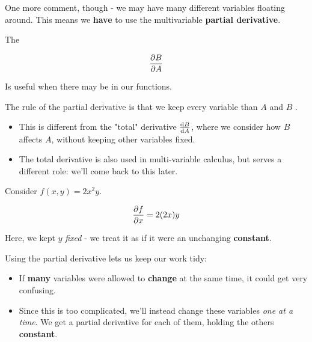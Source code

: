         One more comment, though - we may have many different variables floating around. This means we \textbf{have} to use the multivariable \textbf{partial derivative}.\\
        
        \begin{definition}
            The  
            
            \begin{equation*}
                \frac{\partial B}{\partial A}
            \end{equation*}
            
            Is useful when there may be  in our functions.
            
            The rule of the partial derivative is that we keep every variable  than $A$ and $B$ .

            \subsecdiv

            \begin{itemize}
                \item This is different from the "total" derivative $\frac{\dd B}{\dd A}$, where we consider how $B$ affects $A$, without keeping other variables fixed.

                \item The total derivative is also used in multi-variable calculus, but serves a different role: we'll come back to this later.
            \end{itemize}
        \end{definition}
        
        \miniex Consider $f(x,y) = 2x^2y$.
        
        \begin{equation}
            \frac{\partial f}{\partial x} = 2(2x)y
        \end{equation}
        
        Here, we kept $y$ \textit{fixed} - we treat it as if it were an unchanging \textbf{constant}. 
        
        Using the partial derivative lets us keep our work tidy: 
        
        \begin{itemize}
            \item If \textbf{many} variables were allowed to \textbf{change} at the same time, it could get very confusing. 

            \item Since this is too complicated, we'll instead change these variables \textit{one at a time}. We get a partial derivative for each of them, holding the others \textbf{constant}.
        \end{itemize}
        
